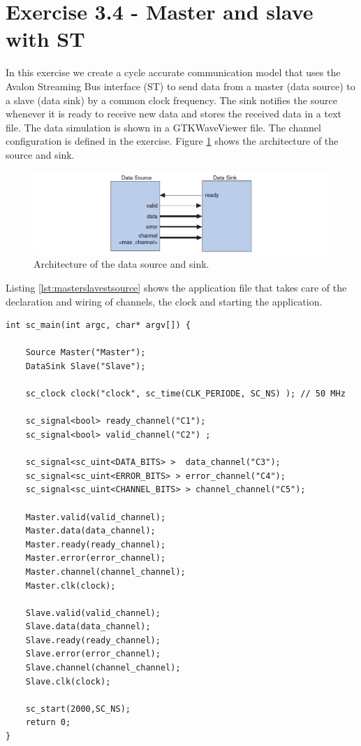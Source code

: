 \section{Exercise 3.4 - Master and slave with ST}

In this exercise we create a cycle accurate communication model that uses the Avalon Streaming Bus interface (ST) to send data from a master (data source) to a slave (data sink) by a common clock frequency. The sink notifies the source whenever it is ready to receive new data and stores the received data in a text file. The data simulation is shown in a GTKWaveViewer file. The channel configuration is defined in the exercise. Figure \ref{fig:masterslave} shows the architecture of the source and sink.

\begin{figure}[h]
	\centering
	\includegraphics[width=1\linewidth]{MasterSlaveST.png}
	\caption{Architecture of the data source and sink.}
	\label{fig:masterslave}
\end{figure}

\noindent Listing \ref{lst:masterslavestsource} shows the application file that takes care of the declaration and wiring of channels, the clock and starting the application.

\begin{lstlisting}[style=customc++, caption=Application file for mater/slave.,
label={lst:masterslavestmain}]
int sc_main(int argc, char* argv[]) {
	
	Source Master("Master");
	DataSink Slave("Slave");
	
	sc_clock clock("clock", sc_time(CLK_PERIODE, SC_NS) ); // 50 MHz
	
	sc_signal<bool> ready_channel("C1");
	sc_signal<bool> valid_channel("C2") ;
	
	sc_signal<sc_uint<DATA_BITS> >  data_channel("C3");
	sc_signal<sc_uint<ERROR_BITS> > error_channel("C4");
	sc_signal<sc_uint<CHANNEL_BITS> > channel_channel("C5");
	
	Master.valid(valid_channel);
	Master.data(data_channel);
	Master.ready(ready_channel);
	Master.error(error_channel);
	Master.channel(channel_channel);
	Master.clk(clock);
	
	Slave.valid(valid_channel);
	Slave.data(data_channel);
	Slave.ready(ready_channel);
	Slave.error(error_channel);
	Slave.channel(channel_channel);
	Slave.clk(clock);
	
	sc_start(2000,SC_NS);
	return 0;
}
\end{lstlisting}

